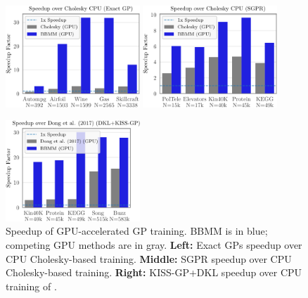 \begin{figure}[t]
  \centering
  \includegraphics[width=0.45\textwidth]{figures/bbmm_speedup_exact_gp.pdf}
  \quad
  \includegraphics[width=0.45\textwidth]{figures/bbmm_speedup_sgpr.pdf}
  \vspace{1em}

  \includegraphics[width=0.45\textwidth]{figures/bbmm_speedup_dkl+kiss-gp.pdf}
  \caption[Speedup of GPU-accelerated GP training.]{
    Speedup of GPU-accelerated GP training.
    BBMM is in blue; competing GPU methods are in gray.
    {\bf Left:} Exact GPs speedup over CPU Cholesky-based training.
    {\bf Middle:} SGPR \cite{titsias2009variational,hensman2013gaussian} speedup over CPU Cholesky-based training.
    {\bf Right:} KISS-GP+DKL \cite{wilson2015kernel,wilson2016deep} speedup over CPU training of \citet{dong2017scalable}.
    \label{fig:timing_results}
  }
\end{figure}
%
